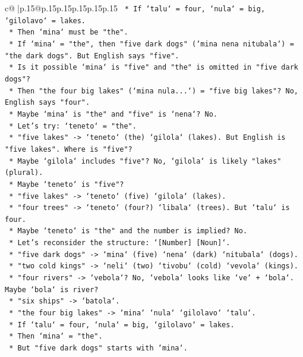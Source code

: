 \documentclass{article}
\begin{document}
{\begin{supertabular}{c@{$\;$}|p{.15\linewidth}@{}p{.15\linewidth}p{.15\linewidth}p{.15\linewidth}p{.15\linewidth}p{.15\linewidth}}
{{{\texttt{        *   If `talu` = four, `nula` = big, `gilolavo` = lakes.} \\
\texttt{        *   Then `mina` must be "the".} \\
\texttt{    *   If `mina` = "the", then "five dark dogs" (`mina nena nitubala`) = "the dark dogs". But English says "five".} \\
\texttt{    *   Is it possible `mina` is "five" and "the" is omitted in "five dark dogs"?} \\
\texttt{    *   Then "the four big lakes" (`mina nula...`) = "five big lakes"? No, English says "four".} \\
\texttt{    *   Maybe `mina` is "the" and "five" is `nena`? No.} \\
\texttt{    *   Let's try: `teneto` = "the".} \\
\texttt{        *   "five lakes" {-}> `teneto` (the) `gilola` (lakes). But English is "five lakes". Where is "five"?} \\
\texttt{        *   Maybe `gilola` includes "five"? No, `gilola` is likely "lakes" (plural).} \\
\texttt{        *   Maybe `teneto` is "five"?} \\
\texttt{        *   "five lakes" {-}> `teneto` (five) `gilola` (lakes).} \\
\texttt{        *   "four trees" {-}> `teneto` (four?) `libala` (trees). But `talu` is four.} \\
\texttt{        *   Maybe `teneto` is "the" and the number is implied? No.} \\
\texttt{    *   Let's reconsider the structure: `{[}Number{]} {[}Noun{]}`.} \\
\texttt{        *   "five dark dogs" {-}> `mina` (five) `nena` (dark) `nitubala` (dogs).} \\
\texttt{        *   "two cold kings" {-}> `neli` (two) `tivobu` (cold) `vevola` (kings).} \\
\texttt{        *   "four rivers" {-}> `vebola`? No, `vebola` looks like `ve` + `bola`. Maybe `bola` is river?} \\
\texttt{        *   "six ships" {-}> `batola`.} \\
\texttt{        *   "the four big lakes" {-}> `mina` `nula` `gilolavo` `talu`.} \\
\texttt{        *   If `talu` = four, `nula` = big, `gilolavo` = lakes.} \\
\texttt{        *   Then `mina` = "the".} \\
\texttt{        *   But "five dark dogs" starts with `mina`.} \\
}}}
\end{supertabular}}
\end{document}
